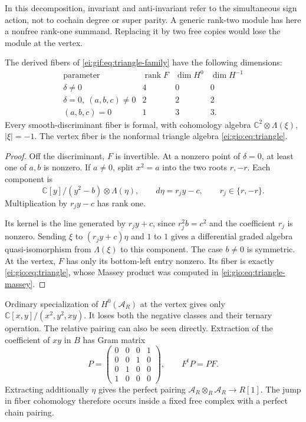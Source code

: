 In this decomposition, invariant and anti-invariant
refer to the simultaneous sign action, not to cochain
degree or super parity. A generic rank-two module
has here a nonfree rank-one summand. Replacing it by
two free copies would lose the module at the vertex.

\begin{proposition}\label{ei:gif:prop:triangle-fibers}
The derived fibers of \eqref{ei:gif:eq:triangle-family}
have the following dimensions:
\[
\begin{array}{c|ccc}
 \text{parameter}&\operatorname{rank}F&\dim H^0&\dim H^{-1}\\\hline
 \delta\ne0&4&0&0\\
 \delta=0,\ (a,b,c)\ne0&2&2&2\\
 (a,b,c)=0&1&3&3.
\end{array}
\]
Every smooth-discriminant fiber is formal, with
cohomology algebra $\mathbb C^2\otimes\Lambda(\xi)$,
$|\xi|=-1$. The vertex fiber is the nonformal
triangle algebra \eqref{ei:gio:eq:triangle}.
\end{proposition}

\begin{proof}
Off the discriminant, $F$ is invertible.
At a nonzero point of $\delta=0$, at least one of
$a,b$ is nonzero. If $a\ne0$, split $x^2=a$ into
the two roots $r,-r$. Each component is
\[
 \mathbb C[y]/(y^2-b)\otimes\Lambda(\eta),
 \qquad d\eta=r_jy-c,\qquad r_j\in\{r,-r\}.
\]
Multiplication by $r_jy-c$ has rank one.

Its kernel is the line generated by $r_jy+c$,
since $r_j^2b=c^2$ and the coefficient $r_j$ is
nonzero. Sending $\xi$ to $(r_jy+c)\eta$ and
$1$ to $1$ gives a differential graded algebra
quasi-isomorphism from $\Lambda(\xi)$ to this
component. The case $b\ne0$ is symmetric.
At the vertex, $F$ has only its bottom-left entry
nonzero. Its fiber is exactly
\eqref{ei:gio:eq:triangle}, whose Massey product was
computed in \eqref{ei:gio:eq:triangle-massey}.
\end{proof}

Ordinary specialization of $H^0(\mathcal A_R)$ at
the vertex gives only
$\mathbb C[x,y]/(x^2,y^2,xy)$. It loses both the
negative classes and their ternary operation.
The relative pairing can also be seen directly.
Extraction of the coefficient of $xy$ in $B$ has
Gram matrix
\[
 P=\begin{pmatrix}
 0&0&0&1\\0&0&1&0\\0&1&0&0\\1&0&0&0
 \end{pmatrix},\qquad F^tP=PF.
\]
Extracting additionally $\eta$ gives the perfect
pairing $\mathcal A_R\otimes_R\mathcal A_R\to R[1]$.
The jump in fiber cohomology therefore occurs inside
a fixed free complex with a perfect chain pairing.

